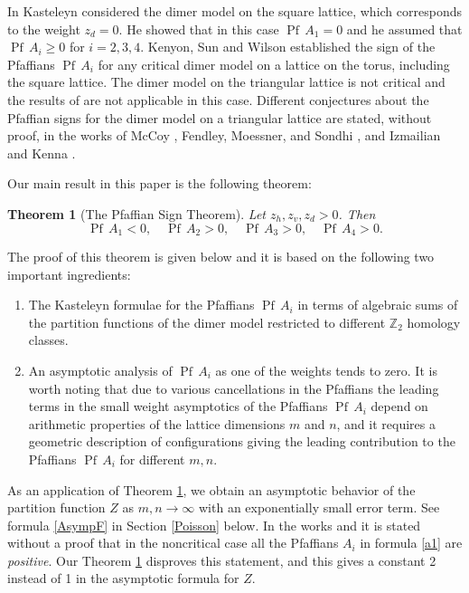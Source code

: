 \documentclass[12pt,reqno]{amsart}
\numberwithin{equation}{section}
\newcommand{\Z}{{\mathbb Z}}
\newcommand{\Pf}{{\operatorname{Pf}\,}}
\newtheorem{theo}{{\sc \bf Theorem}}[section]
\begin{document}
In \cite{Kas1} Kasteleyn considered the dimer model on the square lattice, which corresponds to the weight $z_d=0$. He showed that in this case $\Pf A_1=0$ and he assumed that $\Pf A_i\ge 0$ for $i=2,3,4$. Kenyon, Sun and Wilson \cite{Kenyon} established the sign of the Pfaffians $\Pf A_i$ for any critical dimer model on a lattice on the torus, including the square lattice. The dimer model on the triangular lattice is not critical and the results of \cite{Kenyon} are not applicable in this case. Different conjectures about the Pfaffian signs for the dimer model on a triangular lattice are stated, without proof, in the works of McCoy \cite{McCoy}, Fendley, Moessner, and Sondhi \cite{Fend}, and Izmailian and Kenna \cite{IzmaKenna}. 

Our main result in this paper is the following theorem:

\begin{theo}[The
Pfaffian Sign Theorem]\label{PST} Let $z_h,z_v,z_d>0$. Then
\begin{equation}\label{PSTF}
\Pf A_1<0,\quad \Pf A_2>0,\quad \Pf A_3>0,\quad \Pf A_4>0.
\end{equation}
\end{theo}

The proof of this theorem is given below and it is based on the following two important ingredients:

\begin{enumerate}
\item The Kasteleyn formulae for the Pfaffians $\Pf A_i$ in terms of algebraic sums of the partition functions of the dimer model restricted to different $\Z_2$ homology classes.
\item An asymptotic analysis of $\Pf A_i$ as one of the weights tends to zero. It is worth noting that due to various cancellations in the Pfaffians the leading terms in the small weight asymptotics of the Pfaffians $\Pf A_i$ depend on arithmetic properties of the lattice dimensions $m$ and $n$, and it requires a geometric description of configurations giving the leading contribution to the Pfaffians $\Pf A_i$ for different $m,n$.
\end{enumerate}

As an application of Theorem \ref{PST}, we obtain an asymptotic behavior of the partition function $Z$ as $m,n\to \infty$ with an exponentially small error term.
See formula \eqref{AsympF} in Section \ref{Poisson} below. In the works
\cite{Kenyon} and \cite{McCoy} it is stated without a proof that in the noncritical case all the
Pfaffians $A_i$ in formula \eqref{a1} are {\it positive}. Our Theorem \ref{PST}
disproves this statement, and this gives a constant 2 instead of 1   in the asymptotic formula for $Z$.   
\end{document}
